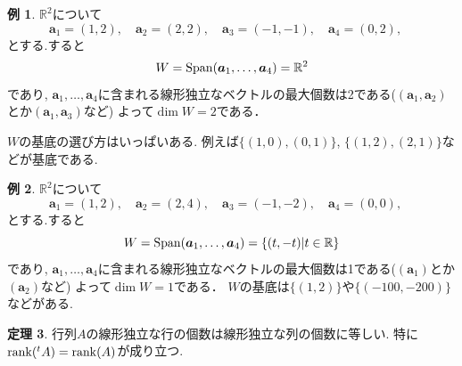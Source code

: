 \documentclass[dvipdfmx,a4paper,11pt]{article}
\newcommand{\R}{\mathbb{R}}
\theoremstyle{definition}
\newtheorem{thm}{定理}
\newtheorem{exa}[thm]{例}
\begin{document}
\begin{exa}
$\R^2$について
$$
\bm{a}_1=(1,2), \quad
\bm{a}_2=(2,2), \quad
\bm{a}_3=(-1,-1), \quad
\bm{a}_4=(0,2), \quad
$$
とする.すると
$$
W = {\rm Span}(\bm{a}_1, \ldots, \bm{a}_4)= \R^2
$$
であり, $\bm{a}_1, \ldots, \bm{a}_4$に含まれる線形独立なベクトルの最大個数は2である($(\bm{a}_1, \bm{a}_2)$とか$(\bm{a}_1, \bm{a}_3)$など)
よって$\dim W=2$である．

$W$の基底の選び方はいっぱいある. 例えば$\{ (1,0), (0,1)\}$, $\{(1,2), (2,1)\}$などが基底である.
\end{exa}

\begin{exa}
$\R^2$について
$$
\bm{a}_1=(1,2), \quad
\bm{a}_2=(2,4), \quad
\bm{a}_3=(-1,-2), \quad
\bm{a}_4=(0,0), \quad
$$
とする.すると
$$
W = {\rm Span}(\bm{a}_1, \ldots, \bm{a}_4)=\{ (t, -t) | t \in \R \}
$$
であり, $\bm{a}_1, \ldots, \bm{a}_4$に含まれる線形独立なベクトルの最大個数は1である($(\bm{a}_1)$とか$(\bm{a}_2)$など)
よって$\dim W=1$である． 
$W$の基底は$\{ (1,2)\}$や$\{ (-100, -200)\}$などがある. 
\end{exa}


\begin{tcolorbox}[
    colback = white,
    colframe = green!35!black,
    fonttitle = \bfseries,
    breakable = true]
    \begin{thm}\cite[定理2.7]{M}
\label{thm-row-column}
行列$A$の線形独立な行の個数は線形独立な列の個数に等しい. 特に ${\rm rank}({}^{t}A)={\rm rank}(A)$が成り立つ. 
  \end{thm}
  \end{tcolorbox}
  
\end{document}
